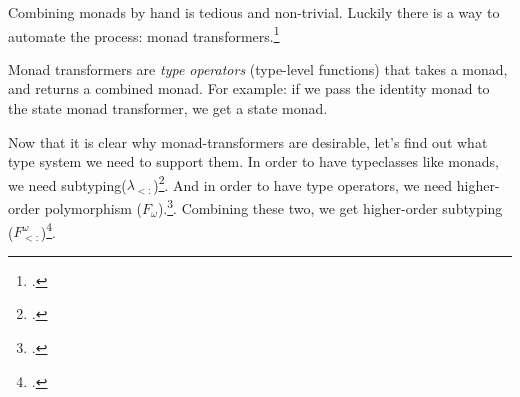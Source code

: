 \begin{multicols}{2}
  Combining monads by hand is tedious and non-trivial.
  Luckily there is a way to automate the process: monad transformers.\footcite[Chapter~18]{Haskell}

  Monad transformers are \textit{type operators} (type-level functions) that takes a monad, and returns a combined monad.
  For example: if we pass the identity monad to the state monad transformer, we get a state monad.

  Now that it is clear why monad-transformers are desirable, let's find out what type system we need to support them.
  In order to have typeclasses like monads, we need subtyping($\lambda_{<:}$)\footcite[Chapter~15]{Pierce02}.
  And in order to have type operators, we need higher-order polymorphism ($F_\omega$).\footcite[Chapter~30]{Pierce02}.
  Combining these two, we get higher-order subtyping ($F^\omega_{<:}$)\footcite[Chapter~31]{Pierce02}.
\end{multicols}
